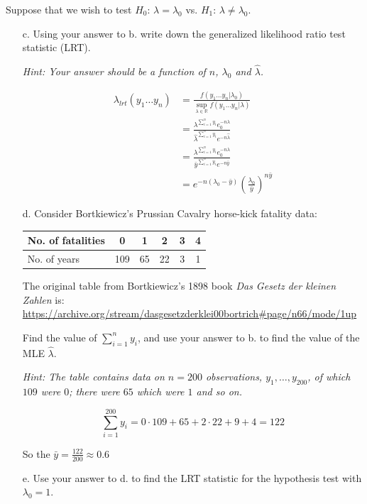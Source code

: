 \documentclass{article}
\newcommand{\field}[1]{\mathbb{#1}}
\newcommand{\1}{\mathbf{1}}
\newcommand{\R}{\field{R}} %
\begin{document}
Suppose that we wish to test $H_0$: $\lambda =\lambda_0$ vs. $H_1$: $\lambda \neq \lambda_0$.
\begin{itemize}
    \item[c.] Using your answer to b. write down the generalized likelihood ratio test statistic (LRT).\par
    {\it Hint: Your answer should be a function of $n$, $\lambda_0$ and $\hat{\lambda}$.}
    
    \begin{align*}
        \lambda_{lrt}(y_1\hdots y_n) &= \frac{f(y_1\hdots y_n|\lambda_0)}{\sup_{\lambda\in\R} f(y_1\hdots y_n|\lambda)} \\
        &= \frac{\lambda^{\sum_{i=1}^n y_i} e^{-n\lambda}_0}{\hat\lambda^{\sum_{i=1}^n y_i} e^{-n\hat\lambda}} \\
        &= \frac{\lambda^{\sum_{i=1}^n y_i} e^{-n\lambda}_0}{\bar y^{\sum_{i=1}^n y_i} e^{-n\bar y}} \\
        &= e^{-n(\lambda_0 - \bar y)} \left(\frac{\lambda_0}{\bar y}\right)^{n\bar y}
    \end{align*}
    
    \item[d.] Consider Bortkiewicz's Prussian Cavalry horse-kick fatality data:
    
        \begin{tabular}{l|ccccc}
        No. of fatalities & 0 & 1 & 2 & 3 & 4\\
        \hline
        No. of years & 109 & 65 & 22 & 3 & 1
        \end{tabular}
    \smallskip
    {\scriptsize The original table from Bortkiewicz's 1898 book {\it Das Gesetz der kleinen Zahlen} is: \url{https://archive.org/stream/dasgesetzderklei00bortrich#page/n66/mode/1up}}
    \smallskip
    
    Find the value of $\sum_{i=1}^{n} y_i$, and use your answer to b. to find the value of the MLE $\hat{\lambda}$.\par
    {\it Hint: The table contains data on $n=200$ observations, $y_1,\ldots ,y_{200}$, of which $109$ were $0$; there were $65$ which were $1$ and so on.}

    $$\sum_{i=1}^{200} y_i = 0\cdot 109 + 65 + 2\cdot 22 + 9 + 4 = 122$$

    So the $\bar y = \frac{122}{200} \approx 0.6$
    
    \item[e.] Use your answer to d. to find the LRT statistic for the hypothesis test with $\lambda_0=1$.\par
    

\end{itemize}
\end{document}
